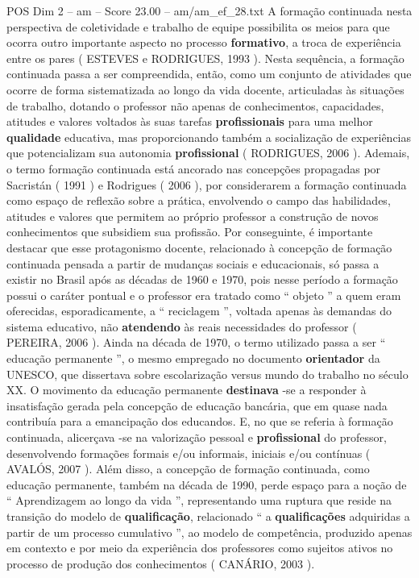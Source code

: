 \begin{textsample}{POS Dim 2 – am – Score 23.00 – am/am\_ef\_28.txt}
A formação continuada nesta perspectiva de coletividade e trabalho de equipe possibilita os meios para que ocorra outro importante aspecto no processo \textbf{formativo}, a troca de experiência entre os pares ( ESTEVES e RODRIGUES, 1993 ).
Nesta sequência, a formação continuada passa a ser compreendida, então, como um conjunto de atividades que ocorre de forma sistematizada ao longo da vida docente, articuladas às situações de trabalho, dotando o professor não apenas de conhecimentos, capacidades, atitudes e valores voltados às suas tarefas \textbf{profissionais} para uma melhor \textbf{qualidade} educativa, mas proporcionando também a socialização de experiências que potencializam sua autonomia \textbf{profissional} ( RODRIGUES, 2006 ).
Ademais, o termo formação continuada está ancorado nas concepções propagadas por Sacristán ( 1991 ) e Rodrigues ( 2006 ), por considerarem a formação continuada como espaço de reflexão sobre a prática, envolvendo o campo das habilidades, atitudes e valores que permitem ao próprio professor a construção de novos conhecimentos que subsidiem sua profissão.
Por conseguinte, é importante destacar que esse protagonismo docente, relacionado à concepção de formação continuada pensada a partir de mudanças sociais e educacionais, só passa a existir no Brasil após as décadas de 1960 e 1970, pois nesse período a formação possui o caráter pontual e o professor era tratado como “ objeto ” a quem eram oferecidas, esporadicamente, a “ reciclagem ”, voltada apenas às demandas do sistema educativo, não \textbf{atendendo} às reais necessidades do professor ( PEREIRA, 2006 ).
Ainda na década de 1970, o termo utilizado passa a ser “ educação permanente ”, o mesmo empregado no documento \textbf{orientador} da UNESCO, que dissertava sobre escolarização versus mundo do trabalho no século XX.
O movimento da educação permanente \textbf{destinava} -se a responder à insatisfação gerada pela concepção de educação bancária, que em quase nada contribuía para a emancipação dos educandos.
E, no que se referia à formação continuada, alicerçava -se na valorização pessoal e \textbf{profissional} do professor, desenvolvendo formações formais e/ou informais, iniciais e/ou contínuas ( AVALÓS, 2007 ).
Além disso, a concepção de formação continuada, como educação permanente, também na década de 1990, perde espaço para a noção de “ Aprendizagem ao longo da vida ”, representando uma ruptura que reside na transição do modelo de \textbf{qualificação}, relacionado “ a \textbf{qualificações} adquiridas a partir de um processo cumulativo ”, ao modelo de competência, produzido apenas em contexto e por meio da experiência dos professores como sujeitos ativos no processo de produção dos conhecimentos ( CANÁRIO, 2003 ).

\end{textsample}
